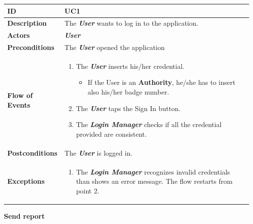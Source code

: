 \documentclass{report}
\begin{document}
\begin{tabularx}{\linewidth}{| l | X |}
	\hline
	\textbf{ID} & UC1\\
	
	\hline
	\textbf{Description} & The \textbf{\textit{User}} wants to log in to the application.\\
	
	\hline
	\textbf{Actors} & \textbf{\textit{User}}\\
	
	\hline
	\textbf{Preconditions} & The \textbf{\textit{User}} opened the application\\
	
	\hline
	\textbf{Flow of Events} & \parbox{0.7\textwidth}{\begin{enumerate}
			\item The \textbf{\textit{User}} inserts his/her credential.
			\begin{itemize}
			\item If the User is an \textbf{Authority}, he/she has to insert also his/her badge number.
			\end{itemize}
			\item The \textbf{\textit{User}} taps the Sign In button.			
			\item The \textbf{\textit{Login Manager}} checks if all the credential provided are consistent.
			
			
	\end{enumerate}}\\
	
	\hline
	\textbf{Postconditions} & The \textbf{\textit{User}} is logged in.\\
	
	\hline
	\textbf{Exceptions} & \parbox{0.7\textwidth}{ \begin{enumerate}
			\item The \textbf{\textit{Login Manager}} recognizes invalid credentials than shows an error message. The flow restarts from point 2. 
		\end{enumerate}}\\
	
	\hline
	
\end{tabularx}
\begin{center}
	\textbf{Send report}
\end{center}
\end{document}
